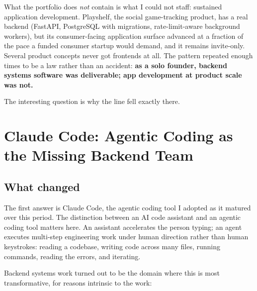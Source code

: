 \documentclass{article}
\begin{document}
What the portfolio does \emph{not} contain is what I could not staff: sustained application development. Playshelf, the social game-tracking product, has a real backend (FastAPI, PostgreSQL with migrations, rate-limit-aware background workers), but its consumer-facing application surface advanced at a fraction of the pace a funded consumer startup would demand, and it remains invite-only. Several product concepts never got frontends at all. The pattern repeated enough times to be a law rather than an accident: \textbf{as a solo founder, backend systems software was deliverable; app development at product scale was not.}

The interesting question is why the line fell exactly there.

\section{Claude Code: Agentic Coding as the Missing Backend Team}

\subsection{What changed}

The first answer is Claude Code, the agentic coding tool I adopted as it matured over this period. The distinction between an AI code assistant and an agentic coding tool matters here. An assistant accelerates the person typing; an agent executes multi-step engineering work under human direction rather than human keystrokes: reading a codebase, writing code across many files, running commands, reading the errors, and iterating.

Backend systems work turned out to be the domain where this is most transformative, for reasons intrinsic to the work:
\end{document}
